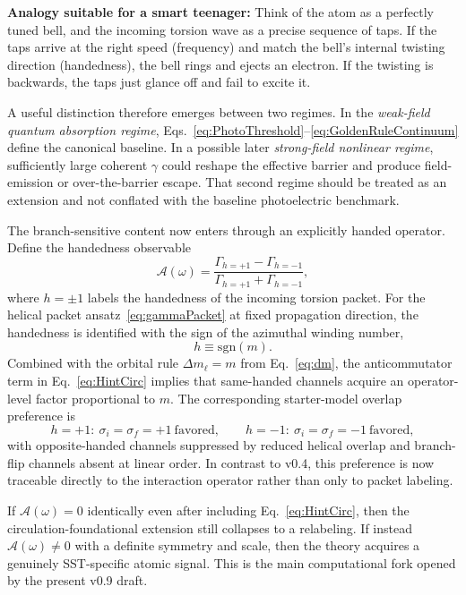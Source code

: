 \documentclass[11pt,a4paper]{article}
\begin{document}
\textbf{Analogy suitable for a smart teenager:} Think of the atom as a perfectly tuned bell, and the incoming torsion wave as a precise sequence of taps. If the taps arrive at the right speed (frequency) and match the bell's internal twisting direction (handedness), the bell rings and ejects an electron. If the twisting is backwards, the taps just glance off and fail to excite it.

A useful distinction therefore emerges between two regimes. In the \emph{weak-field quantum absorption regime}, Eqs.~\eqref{eq:PhotoThreshold}--\eqref{eq:GoldenRuleContinuum} define the canonical baseline. In a possible later \emph{strong-field nonlinear regime}, sufficiently large coherent $\gamma$ could reshape the effective barrier and produce field-emission or over-the-barrier escape. That second regime should be treated as an extension and not conflated with the baseline photoelectric benchmark.

The branch-sensitive content now enters through an explicitly handed operator. Define the handedness observable
\begin{equation}
\label{eq:Asymmetry}
\boxed{
\mathcal A(\omega)
=
\frac{\Gamma_{h=+1}-\Gamma_{h=-1}}{\Gamma_{h=+1}+\Gamma_{h=-1}},
}
\end{equation}
where $h=\pm 1$ labels the handedness of the incoming torsion packet. For the helical packet ansatz~\eqref{eq:gammaPacket} at fixed propagation direction, the handedness is identified with the sign of the azimuthal winding number,
\begin{equation}
\label{eq:h-sign-m}
\boxed{h\equiv \mathrm{sgn}(m).}
\end{equation}
Combined with the orbital rule $\Delta m_\ell=m$ from Eq.~\eqref{eq:dm}, the anticommutator term in Eq.~\eqref{eq:HintCirc} implies that same-handed channels acquire an operator-level factor proportional to $m$. The corresponding starter-model overlap preference is
\begin{equation}
\label{eq:handed-selection}
 h=+1:\ \sigma_i=\sigma_f=+1\  \text{favored},
 \qquad
 h=-1:\ \sigma_i=\sigma_f=-1\  \text{favored},
\end{equation}
with opposite-handed channels suppressed by reduced helical overlap and branch-flip channels absent at linear order. In contrast to v0.4, this preference is now traceable directly to the interaction operator rather than only to packet labeling.

If $\mathcal A(\omega)=0$ identically even after including Eq.~\eqref{eq:HintCirc}, then the circulation-foundational extension still collapses to a relabeling. If instead $\mathcal A(\omega)\neq 0$ with a definite symmetry and scale, then the theory acquires a genuinely SST-specific atomic signal. This is the main computational fork opened by the present v0.9 draft.
\end{document}
